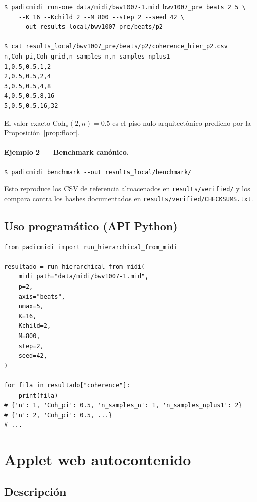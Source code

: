\documentclass[11pt,a4paper,oneside]{article}
\theoremstyle{plain}
\theoremstyle{definition}
\theoremstyle{remark}
\newcommand{\Cohpi}{\mathrm{Coh}_\pi}
\newcommand{\code}[1]{\texttt{\small #1}}
\begin{document}
\begin{lstlisting}[style=shell]
$ padicmidi run-one data/midi/bwv1007-1.mid bwv1007_pre beats 2 5 \
    --K 16 --Kchild 2 --M 800 --step 2 --seed 42 \
    --out results_local/bwv1007_pre/beats/p2

$ cat results_local/bwv1007_pre/beats/p2/coherence_hier_p2.csv
n,Coh_pi,Coh_grid,n_samples_n,n_samples_nplus1
1,0.5,0.5,1,2
2,0.5,0.5,2,4
3,0.5,0.5,4,8
4,0.5,0.5,8,16
5,0.5,0.5,16,32
\end{lstlisting}

El valor exacto $\Cohpi(2,n) = 0.5$ es el piso nulo arquitectónico
predicho por la Proposición~\ref{prop:floor}.

\paragraph{Ejemplo 2 --- Benchmark canónico.}

\begin{lstlisting}[style=shell]
$ padicmidi benchmark --out results_local/benchmark/
\end{lstlisting}

Esto reproduce los CSV de referencia almacenados en
\code{results/verified/} y los compara contra los hashes documentados
en \code{results/verified/CHECKSUMS.txt}.

\subsection{Uso programático (API Python)}\label{sec:install:api}

\begin{lstlisting}[style=python]
from padicmidi import run_hierarchical_from_midi

resultado = run_hierarchical_from_midi(
    midi_path="data/midi/bwv1007-1.mid",
    p=2,
    axis="beats",
    nmax=5,
    K=16,
    Kchild=2,
    M=800,
    step=2,
    seed=42,
)

for fila in resultado["coherence"]:
    print(fila)
# {'n': 1, 'Coh_pi': 0.5, 'n_samples_n': 1, 'n_samples_nplus1': 2}
# {'n': 2, 'Coh_pi': 0.5, ...}
# ...
\end{lstlisting}

\section{Applet web autocontenido}\label{sec:applet}

\subsection{Descripción}
\end{document}
